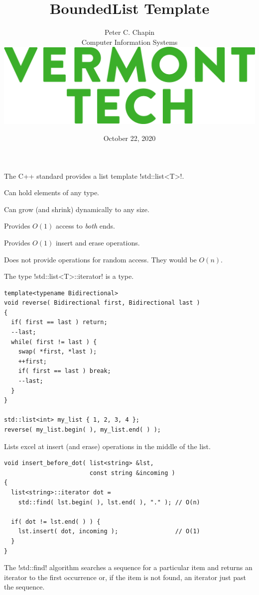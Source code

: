 \documentclass[landscape]{slides}
\title{\color{titlecolor}BoundedList Template}
\author{
  \begin{tabular}{c}
  \\[3mm]
  \Large{Peter C. Chapin} \\[2mm]
  \normalsize{Computer Information Systems}\\[5mm]
  \includegraphics[scale=0.80]{VermontTech_stack_361.jpg}\\[16mm]
  \end{tabular}
}
\date{October 22, 2020}
\begin{document}
\color{Black}
\pagecolor{Background}

\maketitle


The C++ standard provides a list template !std::list<T>!.
\begin{citemize}
\item Can hold elements of any type.
\item Can grow (and shrink) dynamically to any size.
\item Provides $O(1)$ access to \emph{both} ends.
\item Provides $O(1)$ insert and erase operations.
\end{citemize}
Does not provide operations for random access. They would be $O(n)$.
\stopslide


The type !std::list<T>::iterator! is a  type.
\vspace{5mm}
{\small
\begin{lstlisting}
template<typename Bidirectional>
void reverse( Bidirectional first, Bidirectional last )
{
  if( first == last ) return;
  --last;
  while( first != last ) {
    swap( *first, *last );
    ++first;
    if( first == last ) break;
    --last;
  }
}

std::list<int> my_list { 1, 2, 3, 4 };
reverse( my_list.begin( ), my_list.end( ) );
\end{lstlisting}
}
\stopslide


Lists excel at insert (and erase) operations in the middle of the list.
\vspace{5mm}
{\small
\begin{lstlisting}
void insert_before_dot( list<string> &lst,
                        const string &incoming )
{
  list<string>::iterator dot =
    std::find( lst.begin( ), lst.end( ), "." ); // O(n)

  if( dot != lst.end( ) ) {
    lst.insert( dot, incoming );                // O(1)
  }
}
\end{lstlisting}
}
The !std::find! algorithm searches a sequence for a particular item and returns an iterator to
the first occurrence or, if the item is not found, an iterator just past the sequence.
\end{document}

